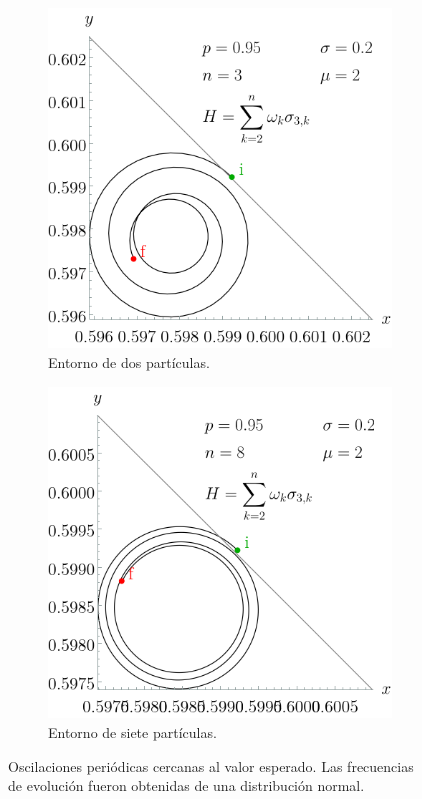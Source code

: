\begin{figure}[ht!]
    \centering
    \begin{subfigure}{0.5\textwidth}
      \centering
      \includegraphics[width=0.9\linewidth]{chapter3/figures_separable/sphere_traject_sigmaz_normal_freq_mean=2_std=0.2_n=3_p=0.95_both.png}
      \caption{Entorno de dos partículas.}
    \end{subfigure}%
    \begin{subfigure}{0.5\textwidth}
      \centering
      \includegraphics[width=0.9\linewidth]{chapter3/figures_separable/sphere_traject_sigmaz_normal_freq_mean=2_std=0.2_n=8_p=0.95_both.png}
      \caption{Entorno de siete partículas.}
    \end{subfigure}
    \caption{Oscilaciones periódicas cercanas al valor esperado. Las frecuencias de evolución fueron obtenidas de una distribución normal.}\label{fig:OscilationsNormalFreqSmallSigm}
\end{figure}

